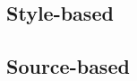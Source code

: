 \documentclass[
10pt, %
a4paper, %
oneside, %
headinclude,footinclude, %
] {book}%
\begin{document}








\subsection{Style-based}
\label{subsec:style_based}



\subsection{Source-based}
\label{subsec:source_based}
\end{document}
